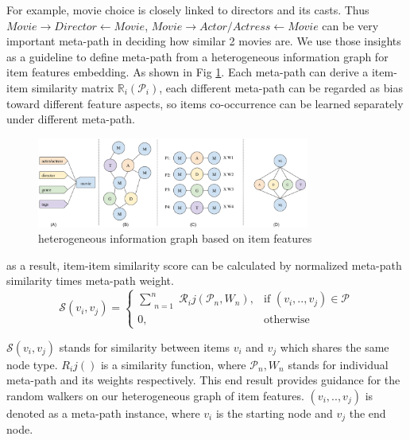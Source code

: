 For example, movie choice is closely linked to directors and its casts. Thus $Movie \rightarrow Director \leftarrow Movie$, $Movie \rightarrow Actor/Actress \leftarrow Movie$  can be very important meta-path in deciding how similar 2 movies are. We use those insights as a guideline to define meta-path from a heterogeneous information graph for item features embedding. As shown in Fig \ref{fig:fe-graph}.
Each meta-path can derive a item-item similarity matrix $\mathbb{R}_i(\mathcal{P}_i)$, each different meta-path can be regarded as bias toward different feature aspects, so items co-occurrence can be learned separately under different meta-path.

\begin{figure}[!t]
    \centering
    \includegraphics[width=0.8\textwidth]{figs/fig1.png}
    \caption{heterogeneous information graph based on item features}\label{fig:fe-graph}
\end{figure}

as a result, item-item similarity score can be calculated by normalized meta-path similarity times meta-path weight.
\begin{equation}\label{itemsim}
    \mathcal{S}(v_i,v_j) = 
    \begin{cases}
         \sum\limits_{\substack{n=1}}^{n} \mathcal{R}_ij(\mathcal{P}_n,{W_n}),& \text{if } (v_{i}, .., v_{j}) \in \mathcal{P} \\
         0,              & \text{otherwise}
     \end{cases}
\end{equation}

$\mathcal{S}(v_i,v_j)$ stands for similarity between items $v_i$ and $v_j$ which shares the same node type. $R_ij()$ is a similarity function, where $\mathcal{P}_n, {W_n}$ stands for individual meta-path and its weights respectively. This end result provides guidance for the random walkers on our heterogeneous graph of item features. $(v_{i}, .., v_{j})$ is denoted as a meta-path instance, where $v_i$ is the starting node and $v_j$ the end node.


